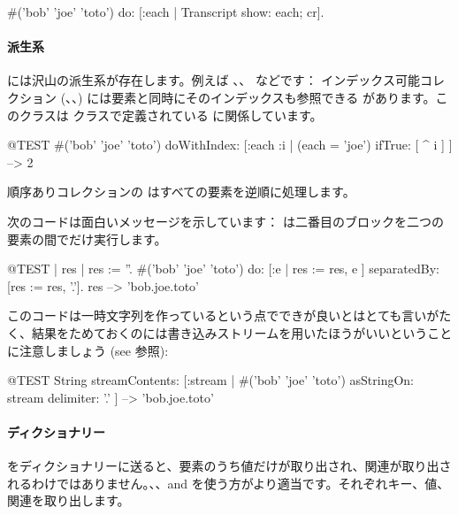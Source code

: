 \documentclass[a4paper,10pt,twoside]{book}
\begin{document}
\begin{code}{}
#('bob' 'joe' 'toto') do: [:each | Transcript show: each; cr].
\end{code}

\paragraph{派生系}  には沢山の派生系が存在します。例えば \mbox{、}\mbox{、} などです：
インデックス可能コレクション (、、) には要素と同時にそのインデックスも参照できる  があります。このクラスは  クラスで定義されている  に関係しています。

\begin{code}{@TEST}
#('bob' 'joe' 'toto') doWithIndex: [:each :i | (each = 'joe') ifTrue: [ ^ i ] ] --> 2
\end{code}

順序ありコレクションの  はすべての要素を逆順に処理します。

次のコードは面白いメッセージを示しています： は二番目のブロックを二つの要素の間でだけ実行します。
\begin{code}{@TEST | res | }
res := ''.
#('bob' 'joe' 'toto') do: [:e | res := res, e ] separatedBy: [res := res, '.'].
res --> 'bob.joe.toto'
\end{code}
\noindent
このコードは一時文字列を作っているという点でできが良いとはとても言いがたく、結果をためておくのには書き込みストリームを用いたほうがいいということに注意しましょう (see  参照):
\begin{code}{@TEST}
String streamContents: [:stream | #('bob' 'joe' 'toto') asStringOn: stream delimiter: '.' ] --> 'bob.joe.toto'
\end{code}



\paragraph{ディクショナリー}
 をディクショナリーに送ると、要素のうち値だけが取り出され、関連が取り出されるわけではありません。、、and  を使う方がより適当です。それぞれキー、値、関連を取り出します。
\end{document}
